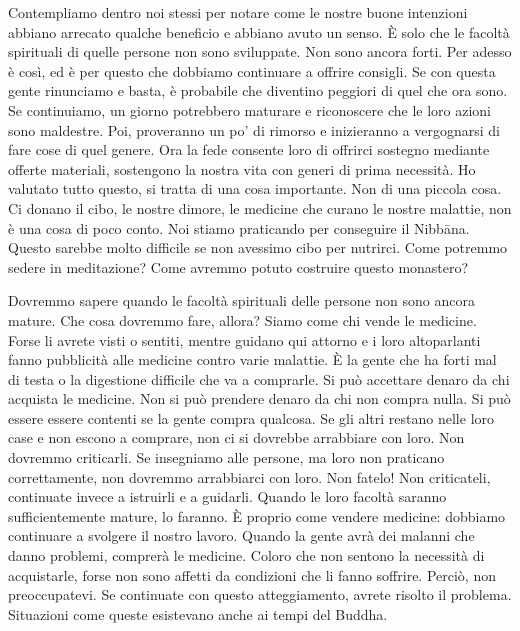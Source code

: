 Contempliamo dentro noi stessi per notare come le nostre buone
intenzioni abbiano arrecato qualche beneficio e abbiano avuto un senso.
È solo che le facoltà spirituali di quelle persone non sono sviluppate.
Non sono ancora forti. Per adesso è così, ed è per questo che dobbiamo
continuare a offrire consigli. Se con questa gente rinunciamo e basta, è
probabile che diventino peggiori di quel che ora sono. Se continuiamo,
un giorno potrebbero maturare e riconoscere che le loro azioni sono
maldestre. Poi, proveranno un po' di rimorso e inizieranno a vergognarsi
di fare cose di quel genere. Ora la fede consente loro di offrirci
sostegno mediante offerte materiali, sostengono la nostra vita con
generi di prima necessità. Ho valutato tutto questo, si tratta di una
cosa importante. Non di una piccola cosa. Ci donano il cibo, le nostre
dimore, le medicine che curano le nostre malattie, non è una cosa di
poco conto. Noi stiamo praticando per conseguire il Nibbāna.
Questo sarebbe molto difficile se non avessimo cibo per nutrirci. Come
potremmo sedere in meditazione? Come avremmo potuto costruire questo
monastero?

Dovremmo sapere quando le facoltà spirituali delle persone non sono
ancora mature. Che cosa dovremmo fare, allora? Siamo come chi vende le
medicine. Forse li avrete visti o sentiti, mentre guidano qui attorno e
i loro altoparlanti fanno pubblicità alle medicine contro varie
malattie. È la gente che ha forti mal di testa o la digestione difficile
che va a comprarle. Si può accettare denaro da chi acquista le medicine.
Non si può prendere denaro da chi non compra nulla. Si può essere essere
contenti se la gente compra qualcosa. Se gli altri restano nelle loro
case e non escono a comprare, non ci si dovrebbe arrabbiare con loro.
Non dovremmo criticarli. Se insegniamo alle persone, ma loro non
praticano correttamente, non dovremmo arrabbiarci con loro. Non fatelo!
Non criticateli, continuate invece a istruirli e a guidarli. Quando le
loro facoltà saranno sufficientemente mature, lo faranno. È proprio come
vendere medicine: dobbiamo continuare a svolgere il nostro lavoro.
Quando la gente avrà dei malanni che danno problemi, comprerà le
medicine. Coloro che non sentono la necessità di acquistarle, forse non
sono affetti da condizioni che li fanno soffrire. Perciò, non
preoccupatevi. Se continuate con questo atteggiamento, avrete risolto il
problema. Situazioni come queste esistevano anche ai tempi del Buddha.


